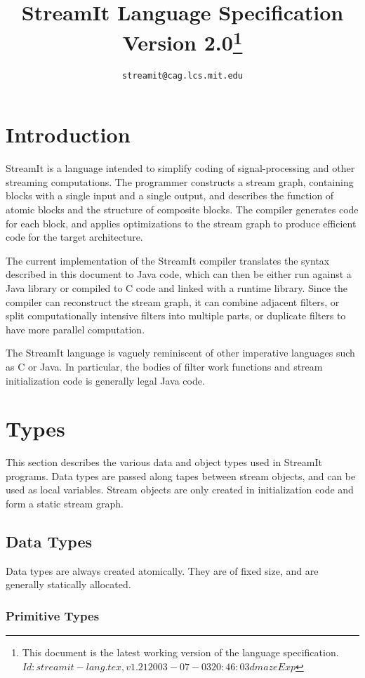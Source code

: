 \documentclass[11pt]{article}
\title{StreamIt Language Specification\\
Version 2.0\ifprerel\thanks{
This document is the latest working version of the language specification.\hfil\break\ttfamily
\hbox{$Id: streamit-lang.tex,v 1.21 2003-07-03 20:46:03 dmaze Exp $}
}\fi}
\author{\texttt{streamit@cag.lcs.mit.edu}}
\begin{document}
\maketitle
\tableofcontents

\section{Introduction}

StreamIt is a language intended to simplify coding of
signal-processing and other streaming computations.  The programmer
constructs a stream graph, containing blocks with a single input and a
single output, and describes the function of atomic blocks and the
structure of composite blocks.  The compiler generates code for each
block, and applies optimizations to the stream graph to produce
efficient code for the target architecture.

The current implementation of the StreamIt compiler translates the
syntax described in this document to Java code, which can then be
either run against a Java library or compiled to C code and linked
with a runtime library.  Since the compiler can reconstruct the stream
graph, it can combine adjacent filters, or split computationally
intensive filters into multiple parts, or duplicate filters to have
more parallel computation.

The StreamIt language is vaguely reminiscent of other imperative
languages such as C or Java.  In particular, the bodies of filter work
functions and stream initialization code is generally legal Java
code.

\section{Types}

This section describes the various data and object types used in
StreamIt programs.  Data types are passed along tapes between stream
objects, and can be used as local variables.  Stream objects are only
created in initialization code and form a static stream graph.

\subsection{Data Types}

Data types are always created atomically.  They are of fixed size, and
are generally statically allocated.

\subsubsection{Primitive Types}
\label{sec:primitive-types}
\end{document}

